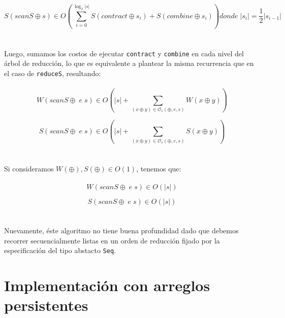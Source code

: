 \documentclass[a4paper,10pt]{article}
\begin{document}
	\begin{equation*}
		S \left( scanS \oplus s \right) \in O \left(\sum_{i=0}^{\log_2 \vert s \vert} S \left( contract \oplus s_i \right) + S \left( combine \oplus s_i \right) \right) donde \; \vert s_i\vert = \frac{1}{2} \vert s_{i-1} \vert
	\end{equation*}
\\
\\	
		Luego, sumamos los costos de ejecutar \texttt{contract} y \texttt{combine} en cada nivel del árbol de reducción, lo que es equivalente a plantear la misma recurrencia que en el caso de \texttt{reduceS}, resultando:
\\
\\
		\begin{equation*}
			W \left( scanS \oplus \;e \; s \right) \in
			O \left( \vert s \vert + \sum_{(x \oplus y) \in \mathcal{O}_s(\oplus,e,s)} W \left( x \oplus y \right) \right)
		\end{equation*}

		\begin{equation*}
			S \left( scanS \oplus \; e \; s \right) \in
			O \left( \vert s \vert + \sum_{(x \oplus y) \in \mathcal{O}_s(\oplus,e,s)} S \left( x \oplus y \right) \right)
		\end{equation*}
\\
\\
		Si consideramos $W(\oplus), S(\oplus) \in O(1)$, tenemos que:
\\
\\
		\begin{equation*}
			W \left( scanS \oplus \; e \; s \right) \in O \left( \vert s \vert \right)
		\end{equation*}
		
		\begin{equation*}
			S \left( scanS \oplus \; e \; s \right) \in O \left( \vert s \vert \right)
		\end{equation*}
\\
\\	
		Nuevamente, éste algoritmo no tiene buena profundidad dado que debemos recorrer secuencialmente listas en un orden de reducción fijado por la especificación del tipo abstacto \texttt{Seq}.
	
\pagebreak	
\part*{Implementación con arreglos persistentes}
\end{document}
